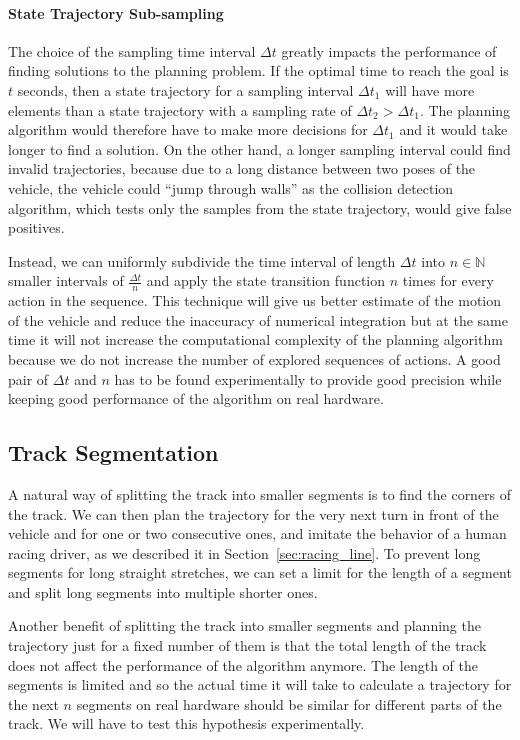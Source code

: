\paragraph{State Trajectory Sub-sampling}

The choice of the sampling time interval $\Delta t$ greatly impacts the performance of finding solutions to the planning problem. If the optimal time to reach the goal is $t$ seconds, then a state trajectory for a sampling interval $\Delta t_1$ will have more elements than a state trajectory with a sampling rate of $\Delta t_2 > \Delta t_1$. The planning algorithm would therefore have to make more decisions for $\Delta t_1$ and it would take longer to find a solution. On the other hand, a longer sampling interval could find invalid trajectories, because due to a long distance between two poses of the vehicle, the vehicle could ``jump through walls'' as the collision detection algorithm, which tests only the samples from the state trajectory, would give false positives.

Instead, we can uniformly subdivide the time interval of length $\Delta t$ into $n\in\mathbb{N}$ smaller intervals of $\frac{\Delta t}{n}$ and apply the state transition function $n$ times for every action in the sequence. This technique will give us better estimate of the motion of the vehicle and reduce the inaccuracy of numerical integration but at the same time it will not increase the computational complexity of the planning algorithm because we do not increase the number of explored sequences of actions. A good pair of $\Delta t$ and $n$ has to be found experimentally to provide good precision while keeping good performance of the algorithm on real hardware.

\subsection{Track Segmentation}

A natural way of splitting the track into smaller segments is to find the corners of the track. We can then plan the trajectory for the very next turn in front of the vehicle and for one or two  consecutive ones, and imitate the behavior of a human racing driver, as we described it in Section~\ref{sec:racing_line}. To prevent long segments for long straight stretches, we can set a limit for the length of a segment and split long segments into multiple shorter ones.

Another benefit of splitting the track into smaller segments and planning the trajectory just for a fixed number of them is that the total length of the track does not affect the performance of the algorithm anymore. The length of the segments is limited and so the actual time it will take to calculate a trajectory for the next $n$ segments on real hardware should be similar for different parts of the track. We will have to test this hypothesis experimentally.

